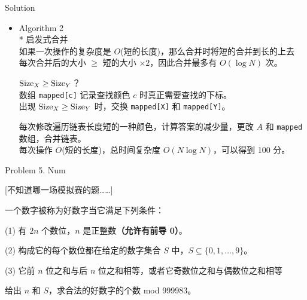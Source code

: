 \documentclass[UTF8]{beamer}
\begin{document}
\begin{frame}{Solution}

\begin{itemize}
    \item Algorithm 2 \\
        * 启发式合并 \\
        如果一次操作的复杂度是 $O$(短的长度)，那么合并时将短的合并到长的上去 \\
        每次合并后的大小 $\geq$ 短的大小 $\times 2$，因此合并最多有 $O(\log N)$ 次。

        \pause
        ${\rm Size}_X \ge {\rm Size}_Y$？ \\
        数组 \texttt{mapped[c]} 记录查找颜色 $c$ 时真正需要查找的下标。 \\
        出现 ${\rm Size}_X \ge {\rm Size}_Y$ 时，交换 \texttt{mapped[X]} 和 \texttt{mapped[Y]}。

        \pause
        每次修改遍历链表长度短的一种颜色，计算答案的减少量，更改 $A$ 和 \texttt{mapped} 数组，合并链表。 \\
        每次操作 $O$(短的长度)，总时间复杂度 $O(N \log N)$，可以得到 100 分。
\end{itemize}

\end{frame}


\begin{frame}{Problem 5. Num}

[不知道哪一场模拟赛的题……]

一个数字被称为好数字当它满足下列条件：

(1) 有 $2n$ 个数位，$n$ 是正整数\textbf{（允许有前导 0）}。

(2) 构成它的每个数位都在给定的数字集合 $S$ 中，$S \subseteq \{0,1,\dots,9\}$。

(3) 它前 $n$ 位之和与后 $n$ 位之和相等，或者它奇数位之和与偶数位之和相等

给出 $n$ 和 $S$，求合法的好数字的个数 mod 999983。

\end{frame}
\end{document}
